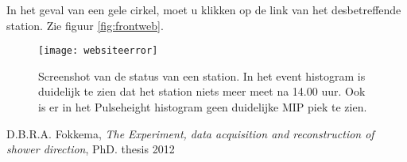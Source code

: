 In het geval van een gele cirkel, moet u klikken op de link van het desbetreffende station. Zie figuur \ref{fig:frontweb}.

 \begin{figure}
\centering
 \texttt{[image: websiteerror]}
 \label{fig:websiteproble}
\caption{Screenshot van de status van een station. In het event histogram is duidelijk te zien dat het station niets meer meet
na 14.00 uur. Ook is er in het Pulseheight histogram geen duidelijke MIP piek te zien.}
\end{figure}




\begin{thebibliography}{9}
        D.B.R.A. Fokkema, \emph{The \hisparc Experiment, data acquisition and reconstruction of shower direction}, PhD. thesis 2012
\end{thebibliography}




